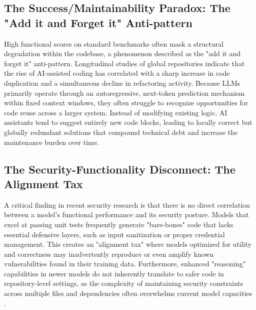 \subsection{The Success/Maintainability Paradox: The "Add it and Forget it" Anti-pattern}

High functional scores on standard benchmarks often mask a structural degradation within the codebase, a phenomenon described as the "add it and forget it" anti-pattern. Longitudinal studies of global repositories indicate that the rise of AI-assisted coding has correlated with a sharp increase in code duplication and a simultaneous decline in refactoring activity. Because LLMs primarily operate through an autoregressive, next-token prediction mechanism within fixed context windows, they often struggle to recognize opportunities for code reuse across a larger system. Instead of modifying existing logic, AI assistants tend to suggest entirely new code blocks, leading to locally correct but globally redundant solutions that compound technical debt and increase the maintenance burden over time.

\subsection{The Security-Functionality Disconnect: The Alignment Tax}

A critical finding in recent security research is that there is no direct correlation between a model’s functional performance and its security posture. Models that excel at passing unit tests frequently generate "bare-bones" code that lacks essential defensive layers, such as input sanitization or proper credential management. This creates an "alignment tax" where models optimized for utility and correctness may inadvertently reproduce or even amplify known vulnerabilities found in their training data. Furthermore, enhanced "reasoning" capabilities in newer models do not inherently translate to safer code in repository-level settings, as the complexity of maintaining security constraints across multiple files and dependencies often overwhelms current model capacities \parencite{sabra2025assessingqualitysecurityaigenerated}.